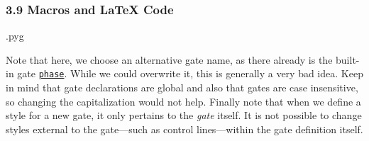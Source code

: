 \documentclass{scrartcl}
\makeatletter
\newenvironment{codeexample}{%
   \VerbatimEnvironment%
   \let\FVB@VerbatimOut\minted@FVB@VerbatimOut
   \let\FVE@VerbatimOut\minted@FVE@VerbatimOut
   \minted@configlang{tex}%
   \minted@fvset
   \begin{VerbatimOut}[codes={\catcode`\^^I=12},firstline,lastline]{\minted@jobname.pyg}%
}{
   \end{VerbatimOut}%
   \minted@langlinenoson%
   \savebox\codeexamplebox{ \minted@jobname.pyg}%
   \ifdim\wd\codeexamplebox>\dimexpr.5\linewidth-3mm\relax%
      \wd\codeexamplebox=.5\linewidth%
   \else%
      \wd\codeexamplebox=\dimexpr\wd\codeexamplebox+3mm\relax%
   \fi%
   \noindent\begin{minipage}{\wd\codeexamplebox}%
      \centering%
      \usebox\codeexamplebox%
   \end{minipage}%
   \begin{minipage}{\dimexpr\linewidth-\wd\codeexamplebox\relax}%
      \expandafter\minted@pygmentize\expandafter{\minted@lang}%
   \end{minipage}%
   \minted@langlinenosoff%
   \par%
}
\newenvironment{codeexample*}{%
   \VerbatimEnvironment%
   \let\FVB@VerbatimOut\minted@FVB@VerbatimOut
   \let\FVE@VerbatimOut\minted@FVE@VerbatimOut
   \minted@configlang{tex}%
   \minted@fvset
   \begin{VerbatimOut}[codes={\catcode`\^^I=12},firstline,lastline]{\minted@jobname.pyg}%
}{
   \end{VerbatimOut}%
   \minted@langlinenoson%
   \begin{adjustbox}{center}
       \minted@jobname.pyg %
   \end{adjustbox}\nopagebreak
   \expandafter\minted@pygmentize\expandafter{\minted@lang}%
   \minted@langlinenosoff%
   \par%
}
\def\gate#1{\hyperref[gate:#1]{\texttt{#1}}}
\makeatother
\begin{document}
            \begin{example}
               \begin{codeexample*}
               \end{codeexample*}
            \end{example}

         \clearpage
         \subsubsection{3.9 Macros and \LaTeX{} Code}
            \begin{example}
               \begin{codeexample}
               \end{codeexample}
               Note that here, we choose an alternative gate name, as there already is the built\hyp in gate \gate{phase}.
               While we could overwrite it, this is generally a very bad idea.
               Keep in mind that gate declarations are global and also that gates are case insensitive, so changing the capitalization would not help.
               Finally note that when we define a style for a new gate, it only pertains to the \emph{gate} itself.
               It is not possible to change styles external to the gate---such as control lines---within the gate definition itself.
            \end{example}
\end{document}
